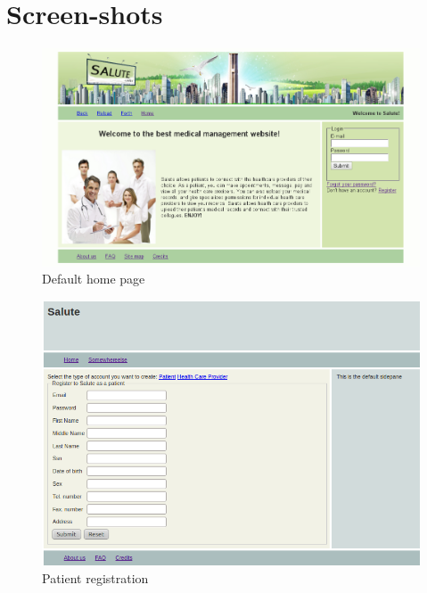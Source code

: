 \chapter{Screen-shots}
\begin{figure}
\includegraphics[scale=0.4]{screenshots/Default.png}
\caption{Default home page}
\end{figure}

\begin{figure}
\includegraphics[scale=0.6]{screenshots/pat_register.png}
\caption{Patient registration}
\end{figure}


